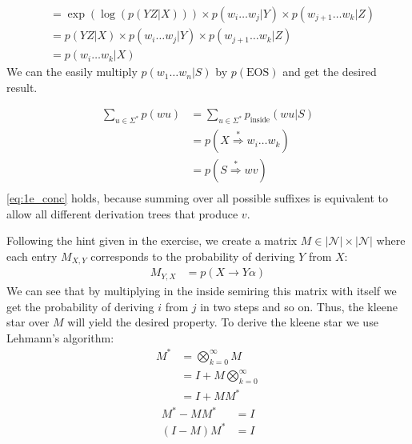 \documentclass[a4paper,12pt]{ETHexercise}
\begin{document}
\begin{question}
\begin{subquestion}
\begin{align}
			                 & = \exp(\log(p(YZ | X))) \times p(w_i \dots w_j | Y) \times p(w_{j+1} \dots w_k | Z)                                    \\
			                 & = p(YZ | X) \times p(w_i \dots w_j | Y) \times p(w_{j+1} \dots w_k | Z)                                                \\
			                 & = p(w_i \dots w_k | X)
		\end{align}
		We can the easily multiply $p(w_1 \dots w_n | S)$ by $p(\text{EOS})$ and get the desired result.
	\end{subquestion}
	\begin{subquestion}
		\begin{align}
			\sum_{u \in \Sigma^*} p(wu) & = \sum_{u \in \Sigma^*} p_{\text{inside}}(wu | S)     \\
			                            & = p(X \overset{*}{\Rightarrow} w_i \dots w_k)         \\
			                            & = p(S \overset{*}{\Rightarrow} wv) \label{eq:1e_conc} \\
		\end{align}
		\cref*{eq:1e_conc} holds, because summing over all possible suffixes is equivalent to allow all different derivation trees that produce $v$.
	\end{subquestion}
	\begin{subquestion}
		Following the hint given in the exercise, we create a matrix $M \in |\mathcal{N}| \times |\mathcal{N}|$ where each entry $M_{X,Y}$ corresponds to the probability of deriving $Y$ from $X$:
		\begin{align}
			M_{Y,X} & = p(X \rightarrow Y\alpha)
		\end{align}
		We can see that by multiplying in the inside semiring this matrix with itself we get the probability of deriving $i$ from $j$ in two steps and so on. Thus, the kleene star over $M$ will yield the desired property. To derive the kleene star we use Lehmann's algorithm:
		\begin{align}
			M^* & =\bigotimes_{k=0}^{\infty} M      \\
			    & = I + M \bigotimes_{k=0}^{\infty} \\
			    & = I + MM^*
		\end{align}
		\begin{align}
			M^*  - MM^* & =I                                 \\
			(I- M)M^*   & = I                                \\

\end{align}
\end{subquestion}
\end{question}
\end{document}
